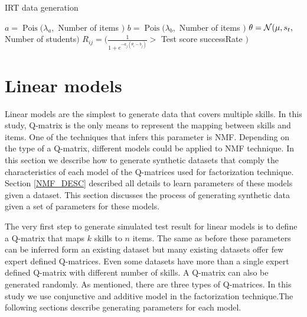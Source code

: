 

\begin{algorithm}
\caption{IRT data generation}
\label{CHalgorithm}
\begin{algorithmic}[1]
\State $a = \operatorname{Pois} ({\lambda_a},$ Number of items $)$
\State $b = \operatorname{Pois} ({\lambda_b},$ Number of items $)$
\State $\theta = \mathcal{N}(\mu, s_t ,$ Number of students$)$
\State $R_{ij} = (\frac{1}{1+e^{-a_j(\theta_i-b_j)}} >$ Test score successRate $)$
\EndFor
\EndFor
\end{algorithmic}
\label{Alg:IRTGen}
\end{algorithm}






\section{Linear models}
\label{LinearModelSynthetic}
Linear models are the simplest to generate data that covers multiple skills. In this study, Q-matrix is the only means to represent the mapping between skills and items. One of the techniques that infers this parameter is NMF. Depending on the type of a Q-matrix, different models could be applied to NMF technique. In this section we describe how to generate synthetic datasets that comply the characteristics of each model of the Q-matrices used for factorization technique. Section \ref{NMF_DESC} described all details to learn parameters of these models given a dataset. This section discusses the process of generating synthetic data given a set of parameters for these models.

The very first step to generate simulated test result for linear models is to define a Q-matrix that maps $k$ skills to $n$ items. The same as before these parameters can be inferred form an existing dataset but many existing datasets offer few expert defined Q-matrices. Even some datasets have more than a single expert defined Q-matrix with different number of skills. A Q-matrix can also be generated randomly. As mentioned, there are three types of Q-matrices. In this study we use conjunctive and additive model in the factorization technique.The following sections describe generating parameters for each model.

